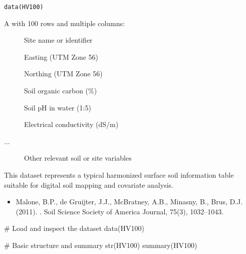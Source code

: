 \documentclass[a4paper]{book}
\begin{document}
%
\begin{Usage}
\begin{verbatim}
data(HV100)
\end{verbatim}
\end{Usage}
%
\begin{Format}
A  with 100 rows and multiple columns:
\begin{description}

\item[] Site name or identifier
\item[] Easting (UTM Zone 56)
\item[] Northing (UTM Zone 56)
\item[] Soil organic carbon (\%)
\item[] Soil pH in water (1:5)
\item[] Electrical conductivity (dS/m)
\item[...] Other relevant soil or site variables

\end{description}

\end{Format}
%
\begin{Details}
This dataset represents a typical harmonized surface soil information table suitable for digital soil mapping and covariate analysis.
\end{Details}
%
\begin{References}
\begin{itemize}

\item{} Malone, B.P., de Gruijter, J.J., McBratney, A.B., Minasny, B., Brus, D.J. (2011). . Soil Science Society of America Journal, 75(3), 1032–1043.

\end{itemize}

\end{References}
%
\begin{Examples}
\begin{ExampleCode}
# Load and inspect the dataset
data(HV100)

# Basic structure and summary
str(HV100)
summary(HV100)
\end{ExampleCode}
\end{Examples}
\end{document}

